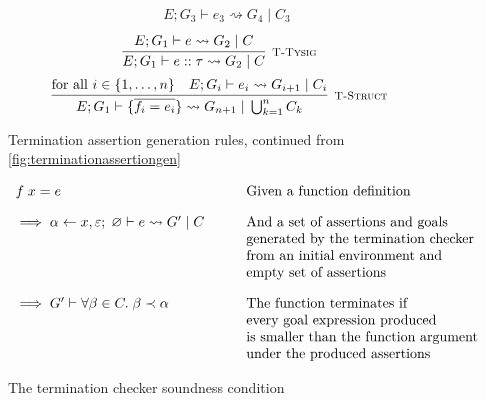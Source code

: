 \begin{figure}
\[{\begin{array}{c}
                \hspace{1em}
                E; G_3 \vdash e_3 \rightsquigarrow G_4\; |\; C_3
            \end{array}
        }
    \]
    \vspace{0.5pt}
    \[
        \infer[\textsc{\footnotesize T-Tysig}]{
            E; G_1 \vdash e :: \tau
                \rightsquigarrow G_2\; |\; C
        }{
            E; G_1 \vdash e \rightsquigarrow G_2\; |\; C
        }
    \]
    \vspace{0.5pt}
    \[
        \infer[\textsc{\footnotesize T-Struct}]{
            E; G_1 \vdash \{\overline{f_i = e_i}\}
                \rightsquigarrow G_{n+1}\; |\; \bigcup_{k = 1}^n C_k
        }{
           \text{for all } i \in \{1, \dots, n\}\quad  E; G_i \vdash e_i 
                \rightsquigarrow G_{i+1}\; |\; C_i
        }
    \]
    
    \caption{Termination assertion generation rules,
             continued from \autoref{fig:terminationassertiongen}}
    \label{fig:terminationassertiongen2}
\end{figure}


\begin{figure}
    \centering
    \[
        \begin{array}{ll}
            f\; x = e              
                & \text{Given a function definition} \\[10pt]
            \implies \alpha \leftarrow x,\varepsilon;\; \varnothing 
                \vdash e \rightsquigarrow G'\; |\; C
                \hspace{2em}
                & \text{And a set of assertions and goals} \\
                & \text{generated by the termination checker} \\
                & \text{from an initial environment and} \\
                & \text{empty set of assertions} \\[10pt]
            \implies G' \vdash \forall \beta \in C.\; \beta \prec \alpha
                & \text{The function terminates if} \\
                & \text{every goal expression produced} \\
                & \text{is smaller than the function argument} \\
                & \text{under the produced assertions}
        \end{array}
    \]
    
    \caption{The termination checker soundness condition}
    \label{fig:terminationcondition}
\end{figure}


